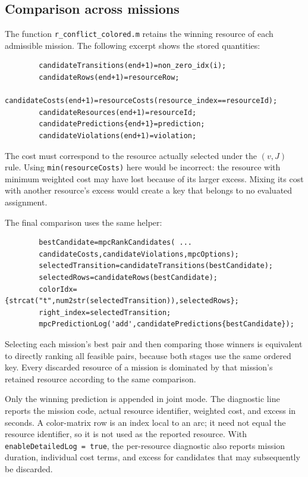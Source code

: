 \subsection{Comparison across missions}

The function \texttt{r\_conflict\_colored.m} retains the winning resource of
each admissible mission. The following excerpt shows the stored quantities:
\begin{small}
	\begin{verbatim}
		candidateTransitions(end+1)=non_zero_idx(i);
		candidateRows(end+1)=resourceRow;
		candidateCosts(end+1)=resourceCosts(resource_index==resourceId);
		candidateResources(end+1)=resourceId;
		candidatePredictions{end+1}=prediction;
		candidateViolations(end+1)=violation;
	\end{verbatim}
\end{small}
The cost must correspond to the resource actually selected under the
$(v,J)$ rule. Using \texttt{min(resourceCosts)} here would be incorrect:
the resource with minimum weighted cost may have lost because of its larger
excess. Mixing its cost with another resource's excess would create a key
that belongs to no evaluated assignment.

The final comparison uses the same helper:
\begin{small}
	\begin{verbatim}
		bestCandidate=mpcRankCandidates( ...
		candidateCosts,candidateViolations,mpcOptions);
		selectedTransition=candidateTransitions(bestCandidate);
		selectedRows=candidateRows(bestCandidate);
		colorIdx={strcat("t",num2str(selectedTransition)),selectedRows};
		right_index=selectedTransition;
		mpcPredictionLog('add',candidatePredictions{bestCandidate});
	\end{verbatim}
\end{small}
Selecting each mission's best pair and then comparing those winners is
equivalent to directly ranking all feasible pairs, because both stages use
the same ordered key. Every discarded resource of a mission is dominated
by that mission's retained resource according to the same comparison.

Only the winning prediction is appended in joint mode. The diagnostic line
reports the mission code, actual resource identifier, weighted cost, and
excess in seconds. A color-matrix row is an index local to an arc; it need
not equal the resource identifier, so it is not used as the reported resource.
With \texttt{enableDetailedLog = true}, the per-resource diagnostic also
reports mission duration, individual cost terms, and excess for candidates
that may subsequently be discarded.

